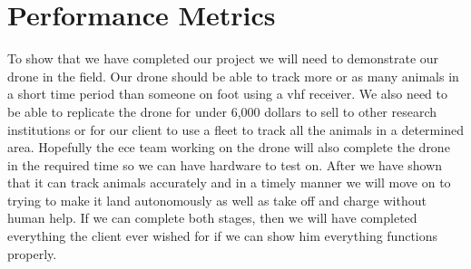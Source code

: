\documentclass[onecolumn, draftclsnofoot,10pt, compsoc]{IEEEtran}
\begin{document}
\section{Performance Metrics}
To show that we have completed our project we will need to demonstrate our drone in the field. Our drone should be able to track more or as many animals in a short time period than someone on foot using a vhf receiver. We also need to be able to replicate the drone for under 6,000 dollars to sell to other research institutions or for our client to use a fleet to track all the animals in a determined area. Hopefully the ece team working on the drone will also complete the drone in the required time so we can have hardware to test on. After we have shown that it can track animals accurately and in a timely manner we will move on to trying to make it land autonomously as well as take off and charge without human help. If we can complete both stages, then we will have completed everything the client ever wished for if we can show him everything functions properly.
\end{document}
